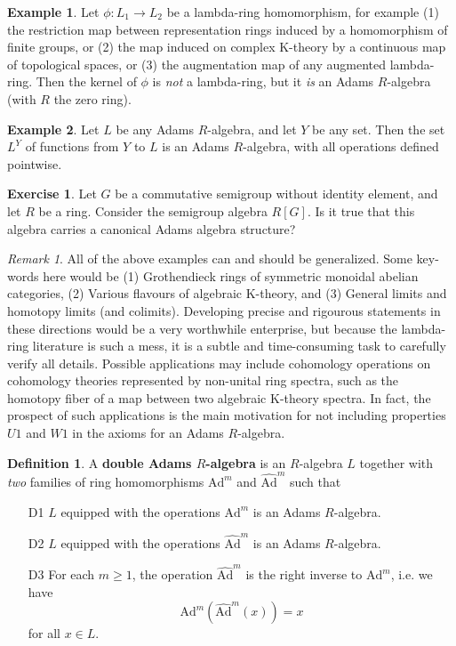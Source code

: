\documentclass[a4paper]{article}
\theoremstyle{definition}
\newtheorem{definition}{Definition}[section]
\newtheorem{example}{Example}[section]
\newtheorem{exercise}{Exercise}[section]
\theoremstyle{remark}
\newtheorem*{remark}{Remark}
\newcommand{\ad}[1]{\text{Ad}^{#1}}
\newcommand{\hatad}[1]{\widehat{\text{Ad}}^{#1}}
\newcommand{\defhl}[1]{\textbf{#1}}
\begin{document}
\begin{example}
Let $\phi: L_1 \to L_2$ be a lambda-ring homomorphism, for example (1) the restriction map between representation rings induced by a homomorphism of finite groups, or (2) the map induced on complex K-theory by a continuous map of topological spaces, or (3) the augmentation map of any augmented lambda-ring. Then the kernel of $\phi$ is \emph{not} a lambda-ring, but it \emph{is} an Adams $R$-algebra (with $R$ the zero ring). 
\end{example}

\begin{example}
Let $L$ be any Adams $R$-algebra, and let $Y$ be any set. Then the set $L^Y$ of functions from $Y$ to $L$ is an Adams $R$-algebra, with all operations defined pointwise. 
\end{example}

\begin{exercise}
Let $G$ be a commutative semigroup without identity element, and let $R$ be a ring. Consider the semigroup algebra $R[G]$. Is it true that this algebra carries a canonical Adams algebra structure?
\end{exercise}

\begin{remark}
All of the above examples can and should be generalized. Some key-words here would be (1) Grothendieck rings of symmetric monoidal abelian categories, (2) Various flavours of algebraic K-theory, and (3) General limits and homotopy limits (and colimits). Developing precise and rigourous statements in these directions would be a very worthwhile enterprise, but because the lambda-ring literature is such a mess, it is a subtle and time-consuming task to carefully verify all details. Possible applications may include cohomology operations on cohomology theories represented by non-unital ring spectra, such as the homotopy fiber of a map between two algebraic K-theory spectra. In fact, the prospect of such applications is the main motivation for not including properties $U1$ and $W1$ in the axioms for an Adams $R$-algebra.
\end{remark}

\begin{definition}
A \defhl{double Adams $R$-algebra} is an $R$-algebra $L$ together with \emph{two} families of ring homomorphisms $\ad{m}$ and $\hatad{m}$ such that
\begin{itemize}
\item[D1] $L$ equipped with the operations $\ad{m}$ is an Adams $R$-algebra.
\item[D2] $L$ equipped with the operations $\hatad{m}$ is an Adams $R$-algebra.
\item[D3] For each $m \geq 1$, the operation $\hatad{m}$ is the right inverse to $\ad{m}$, i.e. we have 
$$     \ad{m} ( \hatad{m}  (x)) = x $$
for all $x \in L$.  
\end{itemize} 
\end{definition}
\end{document}
